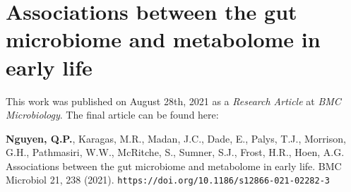 \chapter{Associations between the gut microbiome and metabolome in early life}
This work was published on August 28th, 2021 as a \emph{Research Article} at \emph{BMC Microbiology}. The final article can be found here: 

\begin{center}
\justifying
\textbf{Nguyen, Q.P.}, Karagas, M.R., Madan, J.C., Dade, E., Palys, T.J., Morrison, G.H., Pathmasiri, W.W., McRitche, S., Sumner, S.J., Frost, H.R., Hoen, A.G. Associations between the gut microbiome and metabolome in early life. BMC Microbiol 21, 238 (2021). \texttt{https://doi.org/10.1186/s12866-021-02282-3}
\end{center}

